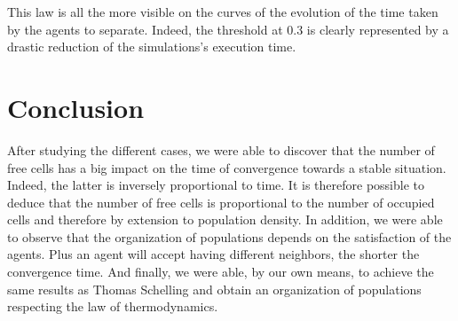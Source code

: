 \documentclass[a4paper, 12pt]{report}
\begin{document}
This law is all the more visible on the curves of the evolution of the time taken by the agents to separate. Indeed, the threshold at 0.3 is clearly represented by
a drastic reduction of the simulations's execution time.

\newpage

\section{Conclusion}

After studying the different cases, we were able to discover that the number of free cells has a big impact on the time of convergence towards a stable situation.
Indeed, the latter is inversely proportional to time. It is therefore possible to deduce that the number of free cells is proportional to the number of occupied cells
and therefore by extension to population density. In addition, we were able to observe that the organization of populations depends on the satisfaction of the agents. Plus an agent
will accept having different neighbors, the shorter the convergence time. And finally, we were able, by our own means, to achieve the same results as Thomas Schelling
and obtain an organization of populations respecting the law of thermodynamics.
\end{document}
